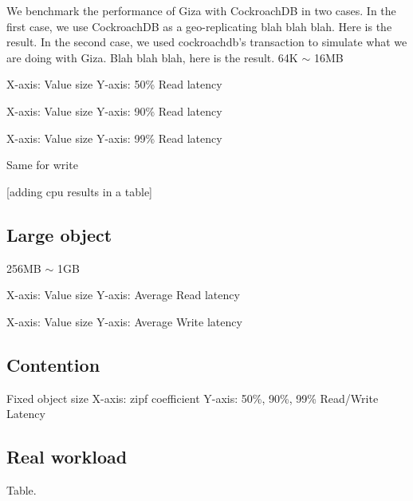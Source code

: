 We benchmark the performance of Giza with CockroachDB in two cases. In the first case, we use CockroachDB as a geo-replicating blah blah blah. Here is the result.
In the second case, we used cockroachdb's transaction to simulate what we are doing with Giza. Blah blah blah, here is the result.
64K $\sim$ 16MB

X-axis: Value size
Y-axis: 50\% Read latency

X-axis: Value size
Y-axis: 90\% Read latency

X-axis: Value size
Y-axis: 99\% Read latency

Same for write

[adding cpu results in a table]

\subsection{Large object}
256MB $\sim$ 1GB

X-axis: Value size
Y-axis: Average Read latency

X-axis: Value size
Y-axis: Average Write latency


\subsection{Contention}

Fixed object size
X-axis: zipf coefficient
Y-axis: 50\%, 90\%, 99\% Read/Write Latency


\subsection{Real workload}
Table.